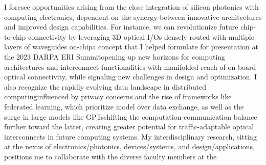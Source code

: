I foresee opportunities arising from the close integration of silicon photonics with computing electronics, dependent on the synergy between innovative architectures and improved design capabilities. For instance, we can revolutionize future chip-to-chip connectivity by leveraging 3D optical I/Os densely routed with multiple layers of waveguides on-chip\textemdash a concept that I helped formulate for presentation at the 2023 DARPA ERI Summit\textemdash opening up new horizons for
computing architectures and interconnect functionalities with manifolded reach of on-board optical connectivity, while signaling new challenges in design and optimization. I also recognize the rapidly evolving data landscape in distributed computing\textemdash influenced by privacy concerns and the rise of frameworks like federated learning, which prioritize model over data exchange, as well as the surge in large models like GPTs\textemdash shifting the computation-communication balance further toward the latter, creating greater potential for traffic-adaptable optical interconnects in future computing systems. My interdisciplinary research, sitting at the nexus of electronics/photonics, devices/systems, and design/applications, positions me to collaborate with the diverse faculty members at the \appSchool{}%